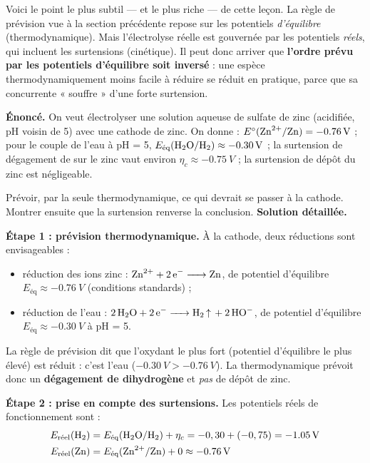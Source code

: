 \documentclass[11pt]{article}
\begin{document}
Voici le point le plus subtil — et le plus riche — de cette leçon. La règle de prévision vue à la section précédente repose sur les potentiels \emph{d'équilibre} (thermodynamique). Mais l'électrolyse réelle est gouvernée par les potentiels \emph{réels}, qui incluent les surtensions (cinétique). Il peut donc arriver que \textbf{l'ordre prévu par les potentiels d'équilibre soit inversé} : une espèce thermodynamiquement moins facile à réduire se réduit en pratique, parce que sa concurrente « souffre » d'une forte surtension.

\begin{exoresolu}
\textbf{Énoncé.} On veut électrolyser une solution aqueuse de sulfate de zinc  (acidifiée, pH voisin de 5) avec une cathode de zinc. On donne : $E^{\circ}(\ce{Zn^2+}/\ce{Zn}) = \SI{-0,76}{V}$ ; pour le couple de l'eau à pH = 5, $E_{\text{éq}}(\ce{H2O}/\ce{H2}) \approx \SI{-0,30}{V}$ ; la surtension de dégagement de  sur le zinc vaut environ $\eta_c \approx \SI{-0,75}{V}$ ; la surtension de dépôt du zinc est négligeable.

Prévoir, par la seule thermodynamique, ce qui devrait se passer à la cathode. Montrer ensuite que la surtension renverse la conclusion.
\tcblower
\textbf{Solution détaillée.}

\textbf{Étape 1 : prévision thermodynamique.} À la cathode, deux réductions sont envisageables :
\begin{itemize}
\item réduction des ions zinc : $\ce{Zn^2+ + 2e- -> Zn}$, de potentiel d'équilibre $E_{\text{éq}} \approx \SI{-0,76}{V}$ (conditions standards) ;
\item réduction de l'eau : $\ce{2H2O + 2e- -> H2 ^ + 2HO-}$, de potentiel d'équilibre $E_{\text{éq}} \approx \SI{-0,30}{V}$ à pH = 5.
\end{itemize}
La règle de prévision dit que l'oxydant le plus fort (potentiel d'équilibre le plus élevé) est réduit : c'est l'eau ($\SI{-0,30}{V} > \SI{-0,76}{V}$). La thermodynamique prévoit donc un \textbf{dégagement de dihydrogène} et \emph{pas} de dépôt de zinc.

\textbf{Étape 2 : prise en compte des surtensions.} Les potentiels réels de fonctionnement sont :
\begin{align*}
E_{\text{réel}}(\ce{H2}) &= E_{\text{éq}}(\ce{H2O}/\ce{H2}) + \eta_c = -0,30 + (-0,75) = \SI{-1,05}{V} \\
E_{\text{réel}}(\ce{Zn}) &= E_{\text{éq}}(\ce{Zn^2+}/\ce{Zn}) + 0 \approx \SI{-0,76}{V}
\end{align*}


\end{exoresolu}
\end{document}
